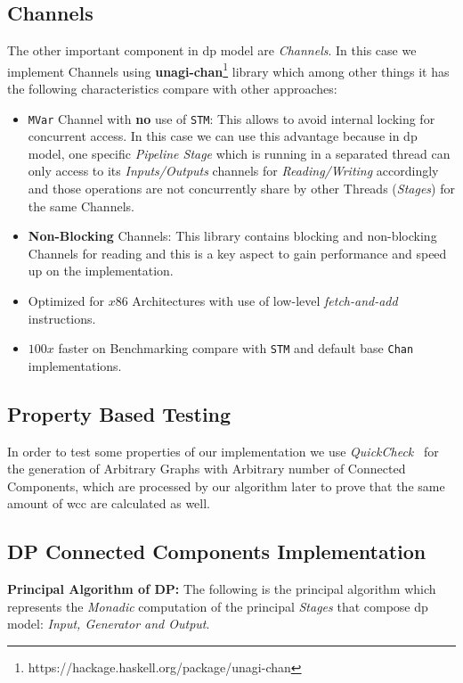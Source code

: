 \documentclass[12pt]{article}
\begin{document}
\subsection{Channels}\label{section:channels}
The other important component in \acrshort{dp} model are \textit{Channels}. In this case we implement Channels using \textbf{unagi-chan}\footnote{https://hackage.haskell.org/package/unagi-chan} library which among other things
it has the following characteristics compare with other approaches:

\begin{itemize}
  \item \texttt{MVar} Channel with \textbf{no} use of \texttt{STM}: This allows to avoid internal locking for concurrent access. In this case
  we can use this advantage because in \acrshort{dp} model, one specific \textit{Pipeline Stage} which is running in a separated thread can only access to its \textit{Inputs/Outputs} channels for \textit{Reading/Writing} accordingly 
  and those operations are not concurrently share by other Threads (\textit{Stages}) for the same Channels.  
  \item \textbf{Non-Blocking} Channels: This library contains blocking and non-blocking Channels for reading and this is a key aspect to gain performance and speed up on the implementation.
  \item Optimized for $x86$ Architectures with use of low-level \textit{fetch-and-add} instructions.
  \item $100x$ faster on Benchmarking compare with \texttt{STM} and default base \texttt{Chan} implementations.
\end{itemize}

\subsection{Property Based Testing}
In order to test some properties of our implementation we use \textit{QuickCheck}~\cite{quickcheck} for the generation of Arbitrary Graphs with Arbitrary number of Connected Components, which are processed
by our algorithm later to prove that the same amount of \acrshort{wcc} are calculated as well.

\subsection{DP Connected Components Implementation}

\textbf{Principal Algorithm of DP:}
The following is the principal algorithm which represents the \textit{Monadic} computation of the principal \textit{Stages} that 
compose \acrshort{dp} model: \textit{Input, Generator and Output}. 
\end{document}
